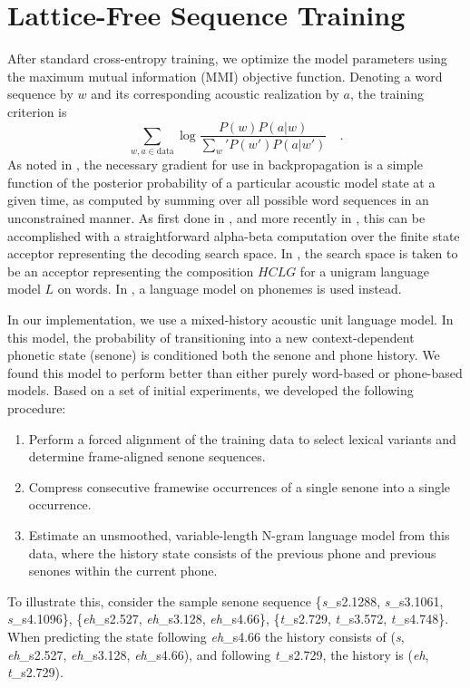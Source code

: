 \documentclass{article}
\begin{document}
\section{Lattice-Free Sequence Training}
\label{sec:lfmmi}

After standard cross-entropy training, we optimize the model parameters using
the maximum mutual information (MMI) objective function. Denoting a word sequence by $w$ and its 
corresponding acoustic realization by $a$, the training criterion is
\[
	\sum_{w,a \in \text{data}} \log \frac{P(w) P(a|w)} {\sum_w' P(w') P(a|w')}	\quad .
\]
As noted in \cite{sim2010sequential,vesely2013sequence},
the necessary gradient for use in backpropagation is a simple function 
of the posterior probability of a  particular acoustic model state at a given
time, as computed by summing over all possible word sequences in an 
unconstrained manner.  As first done in \cite{chen2006advances},  and more
recently in \cite{povey2016purely}, this can be accomplished with a 
straightforward alpha-beta computation over the finite state acceptor 
representing the decoding search space. In \cite{chen2006advances}, the 
search space is taken to be an acceptor representing the composition $HCLG$ for a 
unigram language model $L$ on words.
In \cite{povey2016purely}, a language model on phonemes is used instead.

In our implementation, we use a mixed-history acoustic unit language model.
In this model, the probability of transitioning into a new context-dependent phonetic state (senone)
is conditioned both the senone and phone history.
We found this model to perform better than either purely word-based or phone-based models.
Based on a set of initial experiments, we developed the following procedure:
\begin{enumerate}
\item Perform a forced alignment of the training data to select 
lexical variants and determine frame-aligned senone sequences.
\item Compress consecutive framewise occurrences of a single senone into a single occurrence. 
\item Estimate an unsmoothed, variable-length N-gram language model from this data, where the history state consists of the previous phone and previous senones within the current phone.
\end{enumerate}
\newcommand{\phone}[1]{{\it #1}}
\newcommand{\state}[2]{{\it #1}\_s#2}
To illustrate this, consider the sample senone sequence
\{\state{s}{2.1288}, \state{s}{3.1061}, \state{s}{4.1096}\},
\{\state{eh}{2.527}, \state{eh}{3.128}, \state{eh}{4.66}\},
\{\state{t}{2.729}, \state{t}{3.572}, \state{t}{4.748}\}.
When predicting the state following \state{eh}{4.66} the history consists of
(\phone{s}, \state{eh}{2.527}, \state{eh}{3.128}, \state{eh}{4.66}),
and following \state{t}{2.729}, the history is (\phone{eh}, \state{t}{2.729}).
\end{document}
